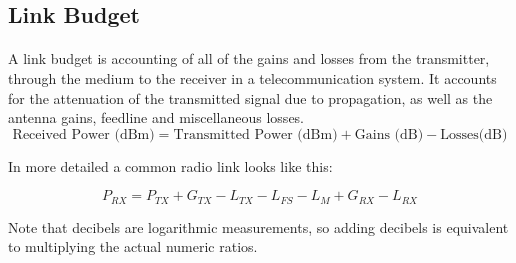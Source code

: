 \subsection{Link Budget}\label{subsec:link_budget}
\paragraph{}
A link budget is accounting of all of the gains and losses from the transmitter, through the medium  to the receiver in a telecommunication system. It accounts for the attenuation of the transmitted signal due to propagation, as well as the antenna gains, feedline and miscellaneous losses. 
\begin{equation*}\label{eq:link_budget} 
 		\text{Received Power (dBm)} = \text{Transmitted Power (dBm)} + \text{Gains (dB)} - \text{Losses(dB)}
\end{equation*}

In more detailed a common radio link looks like this:

\begin{equation*}\label{eq:link_budget} 
 		P_{RX} = P_{TX} + G_{TX} - L_{TX} - L_{FS} - L_{M} + G_{RX} - L_{RX}
\end{equation*}

Note that decibels are logarithmic measurements, so adding decibels is equivalent to multiplying the actual numeric ratios.
